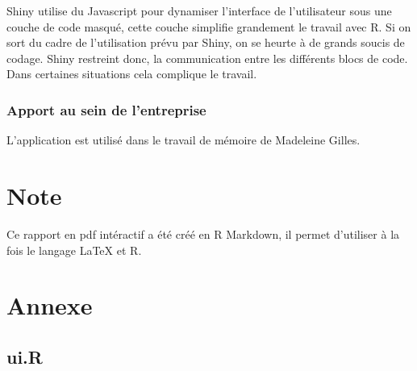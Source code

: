 \documentclass[]{report}
\begin{document}
Shiny utilise du Javascript pour dynamiser l'interface de l'utilisateur
sous une couche de code masqué, cette couche simplifie grandement le
travail avec R. Si on sort du cadre de l'utilisation prévu par Shiny, on
se heurte à de grands soucis de codage. Shiny restreint donc, la
communication entre les différents blocs de code. Dans certaines
situations cela complique le travail.

\subsection{Apport au sein de
l'entreprise}\label{apport-au-sein-de-lentreprise}

L'application est utilisé dans le travail de mémoire de Madeleine
Gilles.

\chapter{Note}\label{note}

Ce rapport en pdf intéractif a été créé en R Markdown, il permet
d'utiliser à la fois le langage LaTeX et R.

\chapter{Annexe}\label{annexe}

\section{ui.R}\label{ui.r}
\end{document}
